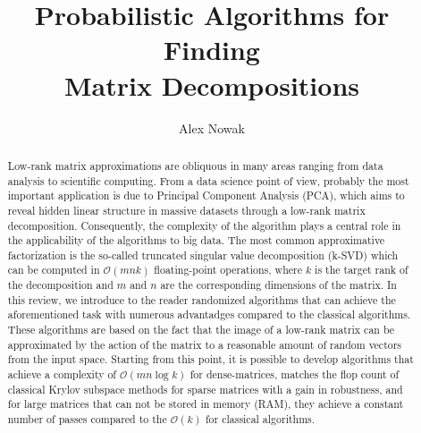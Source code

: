 \documentclass{amsart}
\theoremstyle{definition}
\theoremstyle{remark}
\numberwithin{equation}{section}
\begin{document}
\title{Probabilistic Algorithms for Finding \\ Matrix Decompositions}

\author{Alex Nowak}
\address{Department of Mathematics \\
\'Ecole Normale Sup\'erieure de Cachan}






\begin{abstract}
Low-rank matrix approximations are obliquous in many areas ranging
from data analysis to scientific computing. From a data science point of
view, probably the most important application is due to Principal
Component Analysis (PCA), which aims to reveal hidden linear structure in
massive datasets through a low-rank matrix decomposition. 
Consequently, the complexity of the algorithm plays a central role in the
applicability of the algorithms to big data. The most common
approximative factorization
is the so-called truncated singular value decomposition (k-SVD) which can be 
computed in $\mathcal{O}(mnk)$ floating-point operations, where $k$ is the target rank
of the decomposition and $m$ and $n$ are the corresponding dimensions of the 
matrix.
In this review, we introduce to the reader randomized algorithms 
that can achieve the aforementioned task with numerous advantadges compared
to the classical algorithms. These algorithms are based on the fact that the
image of a low-rank matrix can be approximated by the action
of the matrix to a reasonable amount of random vectors from the input space.
Starting from this point, it is possible to develop
algorithms that achieve a complexity of $\mathcal{O}(mn\log{k})$ for 
dense-matrices, matches the flop count of classical
Krylov subspace methods for sparse matrices with a gain in robustness, and
for large matrices that can not be stored in memory (RAM), they
achieve a constant number of passes compared to the 
$\mathcal{O}(k)$ for classical algorithms.
\end{abstract}
\end{document}
